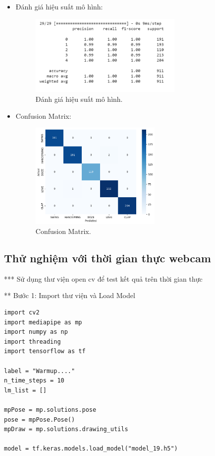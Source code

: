 \begin{itemize}
	\item Đánh giá hiệu suất mô hình:
	
	\begin{figure}[h!]
		\centering
		\includegraphics[width=0.7\textwidth]{Figures/evaluate_model1.PNG}
		\caption[Đánh giá hiệu suất mô hình.]{Đánh giá hiệu suất mô hình.}
		\label{fig:ac} 
	\end{figure}
	
	\item Confusion Matrix:
	
	\begin{figure}[h!]
		\centering
		\includegraphics[width=0.6\textwidth]{Figures/model1_confusion.png}
		\caption[Confusion Matrix.]{Confusion Matrix.}
		\label{fig:fu} 
	\end{figure}
\end{itemize}

\subsection{Thử nghiệm với thời gian thực webcam}

*** Sử dụng thư viện open cv để test kết quả trên thời gian thực 

** Bước 1: Import thư viện và Load Model

\begin{lstlisting}[style=codePython]
import cv2
import mediapipe as mp
import numpy as np
import threading
import tensorflow as tf

label = "Warmup...."
n_time_steps = 10
lm_list = []

mpPose = mp.solutions.pose
pose = mpPose.Pose()
mpDraw = mp.solutions.drawing_utils

model = tf.keras.models.load_model("model_19.h5")					
\end{lstlisting}

